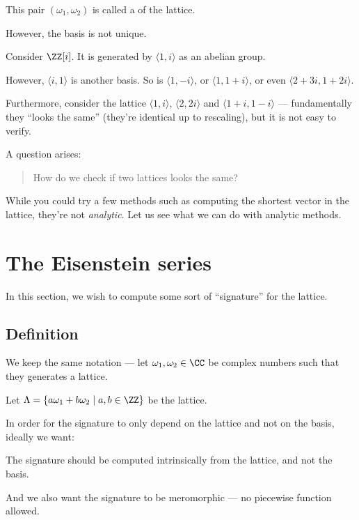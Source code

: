 \begin{remark}
	This pair $(\omega_1, \omega_2)$ is called a  of the lattice.
\end{remark}

However, the basis is not unique.
\begin{example}
	Consider $\ZZ[i]$. It is generated by $\langle 1, i \rangle$ as an abelian group.

	However, $\langle i, 1 \rangle$ is another basis. So is $\langle 1, -i \rangle$,
	or $\langle 1, 1+i \rangle$, or even $\langle 2+3i, 1+2i \rangle$.
\end{example}

Furthermore, consider the lattice $\langle 1, i \rangle$, $\langle 2, 2i \rangle$
and $\langle 1+i, 1-i \rangle$ ---
fundamentally they ``looks the same'' (they're identical up to rescaling), but it is not easy to
verify.

A question arises:
\begin{quote}
	How do we check if two lattices looks the same?
\end{quote}
While you could try a few methods such as computing the shortest vector in the lattice,
they're not \emph{analytic}.
Let us see what we can do with analytic methods.

\section{The Eisenstein series}

In this section, we wish to compute some sort of ``signature'' for the lattice.

\subsection{Definition}

We keep the same notation --- let $\omega_1, \omega_2 \in \CC$ be complex numbers
such that they generates a lattice.

Let $\Lambda = \{ a \omega_1+b \omega_2 \mid a, b \in \ZZ \}$ be the lattice.

In order for the signature to only depend on the lattice and not on the basis, ideally we want:
\begin{moral}
	The signature should be computed intrinsically from the lattice, and not the basis.
\end{moral}
And we also want the signature to be meromorphic --- no piecewise function allowed.

